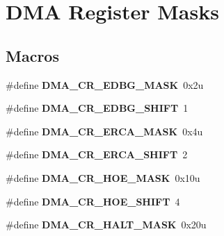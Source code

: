 \hypertarget{group__DMA__Register__Masks}{}\section{D\+MA Register Masks}
\label{group__DMA__Register__Masks}
\subsection*{Macros}
\begin{DoxyCompactItemize}
\item 
\#define {\bfseries D\+M\+A\+\_\+\+C\+R\+\_\+\+E\+D\+B\+G\+\_\+\+M\+A\+SK}~0x2u\hypertarget{group__DMA__Register__Masks_gaa2605f7da2bd6fae13e3e38830bafb1d}{}\label{group__DMA__Register__Masks_gaa2605f7da2bd6fae13e3e38830bafb1d}

\item 
\#define {\bfseries D\+M\+A\+\_\+\+C\+R\+\_\+\+E\+D\+B\+G\+\_\+\+S\+H\+I\+FT}~1\hypertarget{group__DMA__Register__Masks_ga8a25fbfa3435be2df140701c300f6cc5}{}\label{group__DMA__Register__Masks_ga8a25fbfa3435be2df140701c300f6cc5}

\item 
\#define {\bfseries D\+M\+A\+\_\+\+C\+R\+\_\+\+E\+R\+C\+A\+\_\+\+M\+A\+SK}~0x4u\hypertarget{group__DMA__Register__Masks_ga52ad0bfd27aa8dbb1e157eb2c8099c53}{}\label{group__DMA__Register__Masks_ga52ad0bfd27aa8dbb1e157eb2c8099c53}

\item 
\#define {\bfseries D\+M\+A\+\_\+\+C\+R\+\_\+\+E\+R\+C\+A\+\_\+\+S\+H\+I\+FT}~2\hypertarget{group__DMA__Register__Masks_gab3e613091d693c1c110bfbb902d58392}{}\label{group__DMA__Register__Masks_gab3e613091d693c1c110bfbb902d58392}

\item 
\#define {\bfseries D\+M\+A\+\_\+\+C\+R\+\_\+\+H\+O\+E\+\_\+\+M\+A\+SK}~0x10u\hypertarget{group__DMA__Register__Masks_ga6324cec54d0032bcc142e28f4e1b5978}{}\label{group__DMA__Register__Masks_ga6324cec54d0032bcc142e28f4e1b5978}

\item 
\#define {\bfseries D\+M\+A\+\_\+\+C\+R\+\_\+\+H\+O\+E\+\_\+\+S\+H\+I\+FT}~4\hypertarget{group__DMA__Register__Masks_gaddcd684abfce8db15928255dc243dbcb}{}\label{group__DMA__Register__Masks_gaddcd684abfce8db15928255dc243dbcb}

\item 
\#define {\bfseries D\+M\+A\+\_\+\+C\+R\+\_\+\+H\+A\+L\+T\+\_\+\+M\+A\+SK}~0x20u\hypertarget{group__DMA__Register__Masks_ga03242701b29af462fbfd276ea315dd54}{}\label{group__DMA__Register__Masks_ga03242701b29af462fbfd276ea315dd54}


\end{DoxyCompactItemize}

